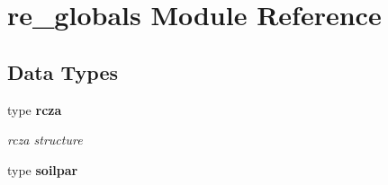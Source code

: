\section{re\+\_\+globals Module Reference}
\label{namespacere__globals}
\subsection*{Data Types}
\begin{DoxyCompactItemize}
\item 
type {\bf rcza}
\begin{DoxyCompactList}\small\item\em rcza structure \end{DoxyCompactList}\item 
type {\bf soilpar}
\end{DoxyCompactItemize}
